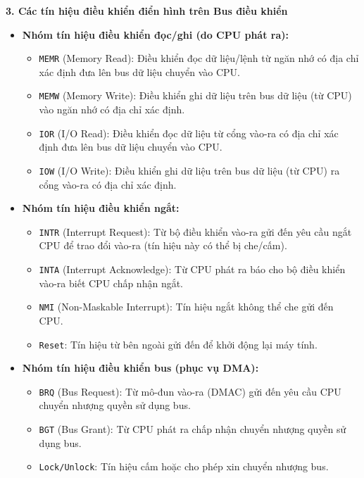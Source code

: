 \textbf{3. Các tín hiệu điều khiển điển hình trên Bus điều khiển}
\begin{itemize}
    \item \textbf{Nhóm tín hiệu điều khiển đọc/ghi (do CPU phát ra):}
    \begin{itemize}
        \item \texttt{MEMR} (Memory Read): Điều khiển đọc dữ liệu/lệnh từ ngăn nhớ có địa chỉ xác định đưa lên bus dữ liệu chuyển vào CPU.
        \item \texttt{MEMW} (Memory Write): Điều khiển ghi dữ liệu trên bus dữ liệu (từ CPU) vào ngăn nhớ có địa chỉ xác định.
        \item \texttt{IOR} (I/O Read): Điều khiển đọc dữ liệu từ cổng vào-ra có địa chỉ xác định đưa lên bus dữ liệu chuyển vào CPU.
        \item \texttt{IOW} (I/O Write): Điều khiển ghi dữ liệu trên bus dữ liệu (từ CPU) ra cổng vào-ra có địa chỉ xác định.
    \end{itemize}
    \item \textbf{Nhóm tín hiệu điều khiển ngắt:}
    \begin{itemize}
        \item \texttt{INTR} (Interrupt Request): Từ bộ điều khiển vào-ra gửi đến yêu cầu ngắt CPU để trao đổi vào-ra (tín hiệu này có thể bị che/cấm).
        \item \texttt{INTA} (Interrupt Acknowledge): Từ CPU phát ra báo cho bộ điều khiển vào-ra biết CPU chấp nhận ngắt.
        \item \texttt{NMI} (Non-Maskable Interrupt): Tín hiệu ngắt không thể che gửi đến CPU.
        \item \texttt{Reset}: Tín hiệu từ bên ngoài gửi đến để khởi động lại máy tính.
    \end{itemize}
    \item \textbf{Nhóm tín hiệu điều khiển bus (phục vụ DMA):}
    \begin{itemize}
        \item \texttt{BRQ} (Bus Request): Từ mô-đun vào-ra (DMAC) gửi đến yêu cầu CPU chuyển nhượng quyền sử dụng bus.
        \item \texttt{BGT} (Bus Grant): Từ CPU phát ra chấp nhận chuyển nhượng quyền sử dụng bus.
        \item \texttt{Lock/Unlock}: Tín hiệu cấm hoặc cho phép xin chuyển nhượng bus.
    \end{itemize}
\end{itemize}


